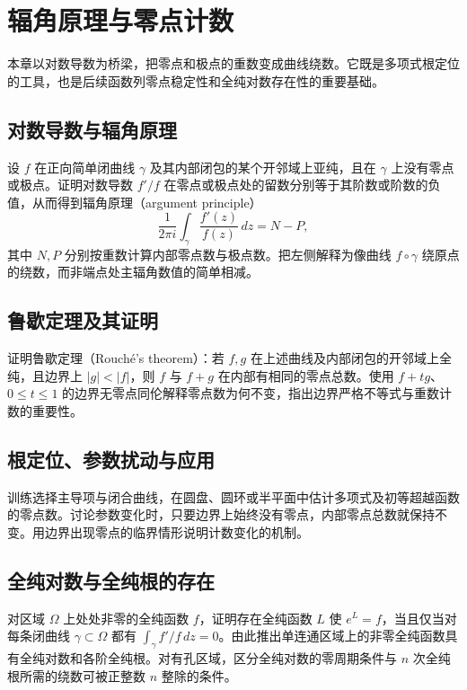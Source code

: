 \documentclass[UTF8,12pt,a4paper,fontset=fandol]{ctexbook}
\begin{document}
\chapter{辐角原理与零点计数}
\label{chap:ca-argument}

本章以对数导数为桥梁，把零点和极点的重数变成曲线绕数。它既是多项式根定位的工具，也是后续函数列零点稳定性和全纯对数存在性的重要基础。

\section{对数导数与辐角原理}
设 $f$ 在正向简单闭曲线 $\gamma$ 及其内部闭包的某个开邻域上亚纯，且在 $\gamma$ 上没有零点或极点。证明对数导数 $f'/f$ 在零点或极点处的留数分别等于其阶数或阶数的负值，从而得到辐角原理（argument principle）
\begin{equation}
  \frac{1}{2\pi i}\int_\gamma\frac{f'(z)}{f(z)}\,dz=N-P,
  \label{eq:ca-argument-principle}
\end{equation}
其中 $N,P$ 分别按重数计算内部零点数与极点数。把左侧解释为像曲线 $f\circ\gamma$ 绕原点的绕数，而非端点处主辐角数值的简单相减。

\section{鲁歇定理及其证明}
证明鲁歇定理（Rouché's theorem）：若 $f,g$ 在上述曲线及内部闭包的开邻域上全纯，且边界上 $|g|<|f|$，则 $f$ 与 $f+g$ 在内部有相同的零点总数。使用 $f+tg$、$0\le t\le1$ 的边界无零点同伦解释零点数为何不变，指出边界严格不等式与重数计数的重要性。

\section{根定位、参数扰动与应用}
训练选择主导项与闭合曲线，在圆盘、圆环或半平面中估计多项式及初等超越函数的零点数。讨论参数变化时，只要边界上始终没有零点，内部零点总数就保持不变。用边界出现零点的临界情形说明计数变化的机制。

\section{全纯对数与全纯根的存在}
对区域 $\Omega$ 上处处非零的全纯函数 $f$，证明存在全纯函数 $L$ 使 $e^L=f$，当且仅当对每条闭曲线 $\gamma\subset\Omega$ 都有 $\int_\gamma f'/f\,dz=0$。由此推出单连通区域上的非零全纯函数具有全纯对数和各阶全纯根。对有孔区域，区分全纯对数的零周期条件与 $n$ 次全纯根所需的绕数可被正整数 $n$ 整除的条件。
\end{document}
